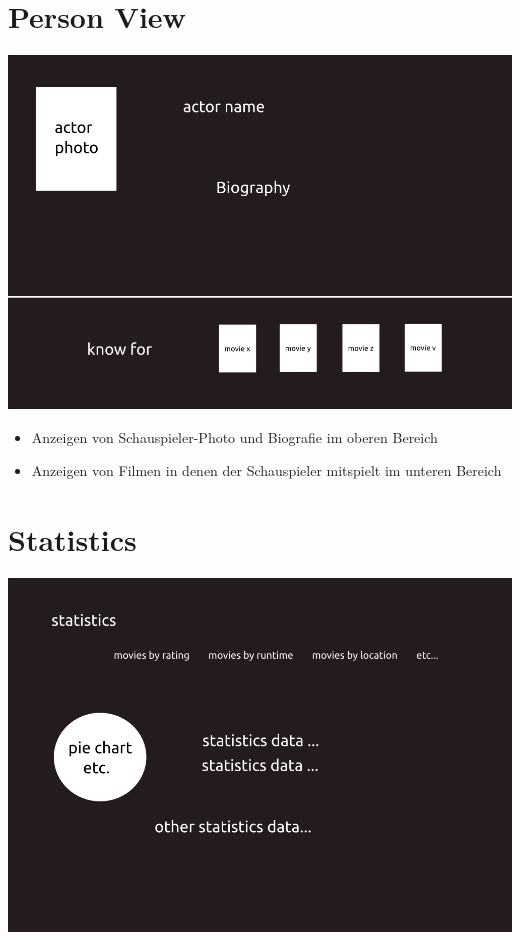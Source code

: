 \documentclass[a4paper]{article}
\begin{document}
\section{Person View%
  \label{person-view}%
}

\includegraphics{./actorview.png}
%
\begin{itemize}

\item Anzeigen von Schauspieler-Photo und Biografie im oberen Bereich

\item Anzeigen von Filmen in denen der Schauspieler mitspielt im unteren Bereich

\end{itemize}


\section{Statistics%
  \label{statistics}%
}

\includegraphics{./statistics.png}
\end{document}
